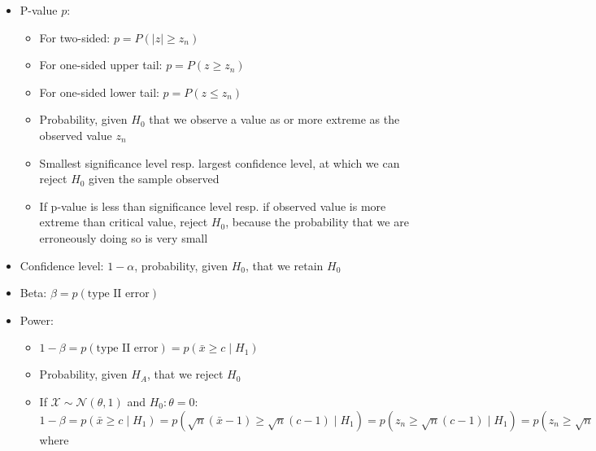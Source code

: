 \begin{itemize}
\begin{itemize}
        \item For one-sided lower tail: $z_{\alpha}$
        \item Associated z-score with $\alpha$
        \item Corresponds to critical value $c$ prior to z-score transformation
        \item If $\mathcal{X} \sim \mathcal{N}(\theta,1)$ and $H_0: \theta = 0$:
        $\alpha = 1-\Phi(\sqrt{n}c) \Rightarrow c = \frac{1}{\sqrt{n}} \Phi^{-1}(1 - \alpha)$ where $\Phi$ is the CDF of the normal distribution
    \end{itemize}
    \item P-value $p$: 
    \begin{itemize}
        \item For two-sided: $p = P(|z| \geq z_n)$
        \item For one-sided upper tail: $p = P(z \geq z_n)$
        \item For one-sided lower tail: $p = P(z \leq z_n)$
        \item Probability, given $H_0$ that we observe a value as or more extreme as the observed value $z_n$ 
        \item Smallest significance level resp. largest confidence level, at which we can reject $H_0$ given the sample observed
        \item If p-value is less than significance level resp. if observed value is more extreme than critical value, reject $H_0$, because the probability that we are erroneously doing so is very small
    \end{itemize}
    \item Confidence level: $1-\alpha$, probability, given $H_0$, that we retain $H_0$
    \item Beta: $\beta = p(\textrm{type II error})$
    \item Power: 
    \begin{itemize}
        \item $1-\beta = p(\textrm{type II error}) = p(\bar{x} \geq c \mid H_1)$
        \item Probability, given $H_A$, that we reject $H_0$
        \item If $\mathcal{X} \sim \mathcal{N}(\theta,1)$ and $H_0: \theta = 0$:
        $1-\beta = p(\bar{x} \geq c \mid H_1) = p(\sqrt{n}(\bar{x}-1) \geq \sqrt{n}(c-1) \mid H_1) = p(z_n \geq \sqrt{n}(c-1) \mid H_1) = p(z_n \geq \sqrt{n}(c-1) \mid H_0) = 1-\Phi(\sqrt{n}(c-1))$ where 
        \begin{itemize}

\end{itemize}
\end{itemize}
\end{itemize}
